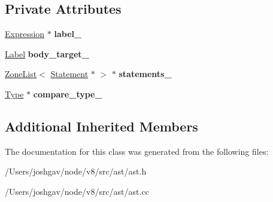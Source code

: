 \subsection*{Private Attributes}
\begin{DoxyCompactItemize}
\item 
\hyperlink{classv8_1_1internal_1_1_expression}{Expression} $\ast$ {\bfseries label\+\_\+}\hypertarget{classv8_1_1internal_1_1_case_clause_ab2fdb48a24eecca7aa4985accb8f3908}{}\label{classv8_1_1internal_1_1_case_clause_ab2fdb48a24eecca7aa4985accb8f3908}

\item 
\hyperlink{classv8_1_1internal_1_1_label}{Label} {\bfseries body\+\_\+target\+\_\+}\hypertarget{classv8_1_1internal_1_1_case_clause_ab1cb56cea6a8100b7faee79984de03f1}{}\label{classv8_1_1internal_1_1_case_clause_ab1cb56cea6a8100b7faee79984de03f1}

\item 
\hyperlink{classv8_1_1internal_1_1_zone_list}{Zone\+List}$<$ \hyperlink{classv8_1_1internal_1_1_statement}{Statement} $\ast$ $>$ $\ast$ {\bfseries statements\+\_\+}\hypertarget{classv8_1_1internal_1_1_case_clause_aa78f1b6b4c927b1d168b41b6efd6733f}{}\label{classv8_1_1internal_1_1_case_clause_aa78f1b6b4c927b1d168b41b6efd6733f}

\item 
\hyperlink{classv8_1_1internal_1_1_type}{Type} $\ast$ {\bfseries compare\+\_\+type\+\_\+}\hypertarget{classv8_1_1internal_1_1_case_clause_ab3517f413f3b0f5798f0b972b4bdb596}{}\label{classv8_1_1internal_1_1_case_clause_ab3517f413f3b0f5798f0b972b4bdb596}

\end{DoxyCompactItemize}
\subsection*{Additional Inherited Members}


The documentation for this class was generated from the following files\+:\begin{DoxyCompactItemize}
\item 
/\+Users/joshgav/node/v8/src/ast/ast.\+h\item 
/\+Users/joshgav/node/v8/src/ast/ast.\+cc\end{DoxyCompactItemize}
